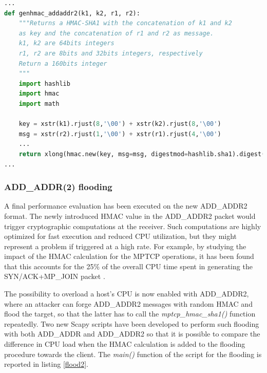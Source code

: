 \begin{lstlisting}[language=Python, caption=HMAC-SHA1 calculation in Python, label=pycrypto]
...
def genhmac_addaddr2(k1, k2, r1, r2):
    """Returns a HMAC-SHA1 with the concatenation of k1 and k2
    as key and the concatenation of r1 and r2 as message.
    k1, k2 are 64bits integers
    r1, r2 are 8bits and 32bits integers, respectively
    Return a 160bits integer
    """
    import hashlib
    import hmac
    import math

    key = xstr(k1).rjust(8,'\00') + xstr(k2).rjust(8,'\00')
    msg = xstr(r2).rjust(1,'\00') + xstr(r1).rjust(4,'\00')
    ...
    return xlong(hmac.new(key, msg=msg, digestmod=hashlib.sha1).digest())
...
\end{lstlisting}

\subsubsection{ADD\_ADDR(2) flooding}
A final performance evaluation has been executed on the new ADD\_ADDR2 format. The newly introduced HMAC value in the ADD\_ADDR2 packet would trigger cryptographic computations at the receiver. Such computations are highly optimized for fast execution and reduced CPU utilization, but they might represent a problem if triggered at a high rate. For example, by studying the impact of the HMAC calculation for the MPTCP operations, it has been found that this accounts for the 25\% of the overall CPU time spent in generating the SYN/ACK+MP\_JOIN packet \cite{P14}.

The possibility to overload a host's CPU is now enabled with ADD\_ADDR2, where an attacker can forge ADD\_ADDR2 messages with random HMAC and flood the target, so that the latter has to call the \textit{mptcp\_hmac\_sha1()} function repeatedly. Two new Scapy scripts have been developed to perform such flooding with both ADD\_ADDR \cite{add-addr-flood} and ADD\_ADDR2 \cite{add-addr-2-flood} so that it is possible to compare the difference in CPU load when the HMAC calculation is added to the flooding procedure towards the client. The \textit{main()} function of the script for the flooding is reported in listing \ref{flood2}.

